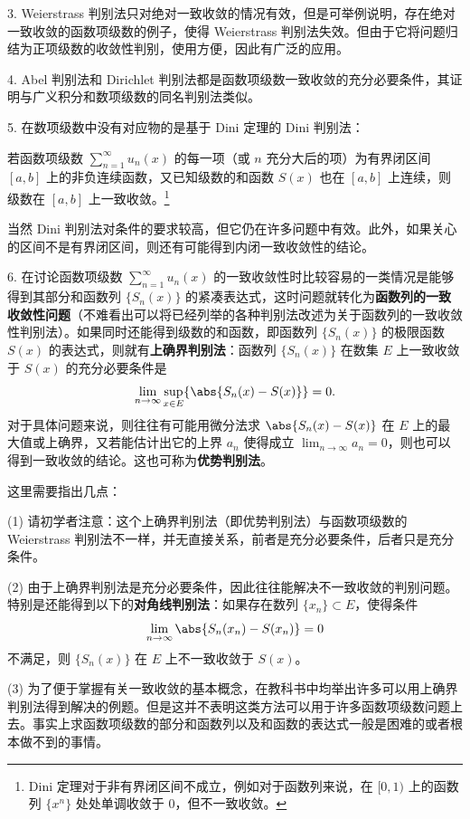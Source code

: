 3. Weierstrass 判别法只对绝对一致收敛的情况有效，但是可举例说明，存在绝对一致收敛的函数项级数的例子，使得 Weierstrass 判别法失效。但由于它将问题归结为正项级数的收敛性判别，使用方便，因此有广泛的应用。

4. Abel 判别法和 Dirichlet 判别法都是函数项级数一致收敛的充分必要条件，其证明与广义积分和数项级数的同名判别法类似。

5. 在数项级数中没有对应物的是基于 Dini 定理的 Dini 判别法：

\begin{xtheorem}[Dini 定理]
若函数项级数 $\displaystyle\sum_{n=1}^{\infty}u_n(x)$ 的每一项（或 $n$ 充分大后的项）为有界闭区间 $[a,b]$ 上的非负连续函数，又已知级数的和函数 $S(x)$ 也在 $[a,b]$ 上连续，则级数在 $[a,b]$ 上一致收敛。\footnote{Dini 定理对于非有界闭区间不成立，例如对于函数列来说，在 $[0,1)$ 上的函数列 $\{x^n\}$ 处处单调收敛于 $0$，但不一致收敛。}
\end{xtheorem}

当然 Dini 判别法对条件的要求较高，但它仍在许多问题中有效。此外，如果关心的区间不是有界闭区间，则还有可能得到内闭一致收敛性的结论。

6. 在讨论函数项级数 $\displaystyle\sum_{n=1}^{\infty}u_n(x)$ 的一致收敛性时比较容易的一类情况是能够得到其部分和函数列 $\{S_n(x)\}$ 的紧凑表达式，这时问题就转化为\textbf{函数列的一致收敛性问题}（不难看出可以将已经列举的各种判别法改述为关于函数列的一致收敛性判别法）。如果同时还能得到级数的和函数，即函数列 $\{S_n(x)\}$ 的极限函数 $S(x)$ 的表达式，则就有\textbf{上确界判别法}：函数列 $\{S_n(x)\}$ 在数集 $E$ 上一致收敛于 $S(x)$ 的充分必要条件是
\[
  \lim_{n\to\infty}\sup_{x\in E}\{\abs{S_n(x)-S(x)}\}=0.
\]
对于具体问题来说，则往往有可能用微分法求 $\abs{S_n(x)-S(x)}$ 在 $E$ 上的最大值或上确界，又若能估计出它的上界 $a_n$ 使得成立 $\displaystyle\lim_{n\to\infty}a_n=0$，则也可以得到一致收敛的结论。这也可称为\textbf{优势判别法}。

这里需要指出几点：

(1) 请初学者注意：这个上确界判别法（即优势判别法）与函数项级数的 Weierstrass 判别法不一样，并无直接关系，前者是充分必要条件，后者只是充分条件。

(2) 由于上确界判别法是充分必要条件，因此往往能解决不一致收敛的判别问题。特别是还能得到以下的\textbf{对角线判别法}：如果存在数列 $\{x_n\}\subset E$，使得条件
\[
  \lim_{n\to\infty}\abs{S_n(x_n)-S(x_n)}=0
\]
不满足，则 $\{S_n(x)\}$ 在 $E$ 上不一致收敛于 $S(x)$。

(3) 为了便于掌握有关一致收敛的基本概念，在教科书中均举出许多可以用上确界判别法得到解决的例题。但是这并不表明这类方法可以用于许多函数项级数问题上去。事实上求函数项级数的部分和函数列以及和函数的表达式一般是困难的或者根本做不到的事情。

